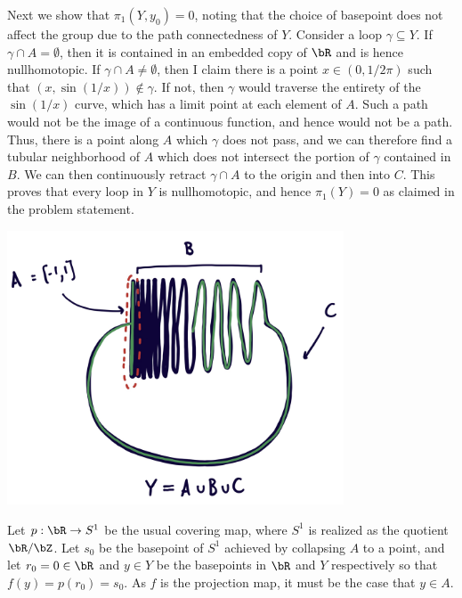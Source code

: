 \begin{homework}[e]
\begin{prf}
    Next we show that $\pi_1(Y,y_0) = 0$, noting that the choice of basepoint does not affect the group due to the path connectedness of $Y$. Consider a loop $\gamma \subseteq Y$. If $\gamma\cap A = \emptyset$, then it is contained in an embedded copy of $\bR$ and is hence nullhomotopic. If $\gamma \cap A \neq \emptyset$, then I claim there is a point $x \in (0,1/2\pi)$ such that $(x,\sin(1/x))\not\in \gamma$. If not, then $\gamma$ would traverse the entirety of the $\sin(1/x)$ curve, which has a limit point at each element of $A$. Such a path would not be the image of a continuous function, and hence would not be a path. Thus, there is a point along $A$ which $\gamma$ does not pass, and we can therefore find a tubular neighborhood of $A$ which does not intersect the portion of $\gamma$ contained in $B$. We can then continuously retract $\gamma \cap A$ to the origin and then into $C$. This proves that every loop in $Y$ is nullhomotopic, and hence $\pi_1(Y) = 0$ as claimed in the problem statement.
    \begin{center}
      \includegraphics[width=10cm]{figures/hwk6-fig2.png}
      \label{fig:prob1-2}
    \end{center}

    \bigskip

    Let $p:\bR\to S^1$ be the usual covering map, where $S^1$ is realized as the quotient $\bR/\bZ$. Let $s_0$ be the basepoint of $S^1$ achieved by collapsing $A$ to a point, and let $r_0 = 0 \in \bR$ and $y \in Y$ be the basepoints in $\bR$ and $Y$ respectively so that $f(y) = p(r_0) = s_0$. As $f$ is the projection map, it must be the case that $y \in A$.


\end{prf}
\end{homework}
